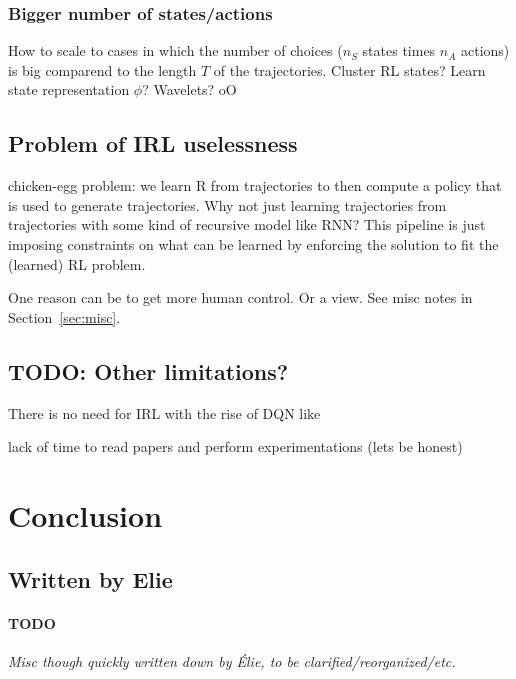 \documentclass{article}
\begin{document}
\subsubsection{Bigger number of states/actions}

How to scale to cases in which the number of choices ($n_S$ states times $n_A$ actions) is big comparend to the length $T$ of the trajectories. Cluster RL states? Learn state representation $\phi$? Wavelets? oO

\subsection{Problem of IRL uselessness}

chicken-egg problem: we learn R from trajectories to then compute a policy that is used to generate trajectories. Why not just learning trajectories from trajectories with some kind of recursive model like RNN? This pipeline is just imposing constraints on what can be learned by enforcing the solution to fit the (learned) RL problem.

One reason can be to get more human control. Or a view. See misc notes in Section~\ref{sec:misc}.

\subsection{TODO: Other limitations?}

There is no need for IRL with the rise of DQN like \cite{Mnih15}

lack of time to read papers and perform experimentations (lets be honest)

\section{Conclusion}


\subsection{Written by Elie \label{sec:misc}}

\paragraph{TODO}
\emph{Misc though quickly written down by Élie, to be clarified/reorganized/etc.}
\end{document}
